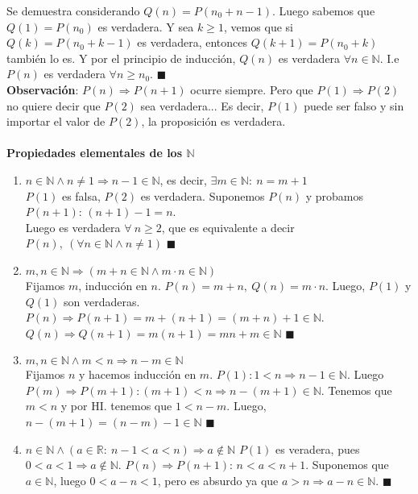 \documentclass[11pt,a4paper]{article}
\newcommand*{\QEDA}{\null\nobreak\hfill\ensuremath{\blacksquare}}
\begin{document}
Se demuestra considerando $Q(n) = P(n_0 + n - 1)$. Luego sabemos que $Q(1) = P(n_0)$ es verdadera. Y sea $k \geq 1$, vemos que si $Q(k) = P(n_0 + k - 1)$ es verdadera, entonces $Q(k+1) = P(n_0 + k)$ tambi\'en lo es. Y por el principio de inducci\'on, $Q(n)$ es verdadera $\forall n \in \mathbb{N}$. I.e $P(n)$ es verdadera $\forall n \geq n_0$. \QEDA\\

\noindent \textbf{Observaci\'on}: $P(n) \Rightarrow P(n+1)$ ocurre siempre. Pero que $P(1)\Rightarrow P(2)$ no quiere decir que $P(2)$ sea verdadera... Es decir, $P(1)$ puede ser falso y sin importar el valor de $P(2)$, la proposici\'on es verdadera.\\

\noindent \dotfill\\
\textbf{Propiedades elementales de los $\mathbb{N}$}
\begin{enumerate}
\item $n\in\mathbb{N} \land n\not=1 \Rightarrow n-1 \in \mathbb{N}$, es decir, $\exists m \in \mathbb{N}:\ n=m+1$\\
$P(1)$ es falsa, $P(2)$ es verdadera. Suponemos $P(n)$ y probamos $P(n+1)$: $(n+1)-1=n$.\\ Luego es verdadera $\forall\ n\geq2$, que es equivalente a decir $P(n),\ (\forall n \in \mathbb{N} \land n\not=1)$ \QEDA
\item $m,n\in\mathbb{N} \Rightarrow (m+n\in\mathbb{N} \land m\cdot n \in \mathbb{N})$\\
Fijamos $m$, inducci\'on en $n$. $P(n) = m + n,\ Q(n) = m\cdot n$. Luego, $P(1)$ y $Q(1)$ son verdaderas. $P(n)\Rightarrow P(n+1) = m+(n+1) = (m+n)+1 \in \mathbb{N}$.\\ $Q(n)\Rightarrow Q(n+1)  = m(n+1) = mn+m \in \mathbb{N}$ \QEDA
\item $m,n\in\mathbb{N} \land m<n \Rightarrow n-m\in\mathbb{N}$\\
Fijamos $n$ y hacemos inducci\'on en $m$. $P(1): 1<n \Rightarrow n-1\in\mathbb{N}$. Luego $P(m)\Rightarrow P(m+1): (m+1)<n \Rightarrow n-(m+1) \in \mathbb{N}$. Tenemos que $m<n$ y por HI. tenemos que $1<n-m$. Luego, $n-(m+1) = (n-m)-1 \in \mathbb{N}$ \QEDA
\item $n\in\mathbb{N} \land (a\in\mathbb{R}:\ n-1<a<n) \Rightarrow a\not\in\mathbb{N}$
$P(1)$ es veradera, pues $0<a<1 \Rightarrow a \not \in \mathbb{N}$. $P(n)\Rightarrow P(n+1)$: $n<a<n+1$. Suponemos que $a\in\mathbb{N}$, luego $0<a-n<1$, pero es absurdo ya que $a>n\Rightarrow a-n \in \mathbb{N}$. \QEDA 
\end{enumerate}
\end{document}
